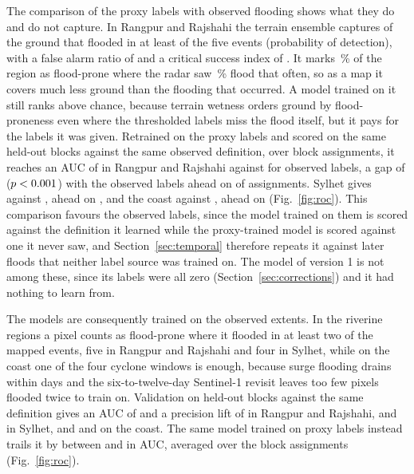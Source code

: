 \documentclass[10pt,a4paper,twocolumn]{article}
\begin{document}
\label{sec:labelresult}
The comparison of the proxy labels with observed flooding shows what they do and do not capture. In Rangpur and Rajshahi the terrain ensemble captures \RRProxyPOD{} of the ground that flooded in at least \RRMinEvents{} of the five events (probability of detection), with a false alarm ratio of \RRProxyFAR{} and a critical success index of \RRProxyCSI{}. It marks \RRProxyShare{}\,\% of the region as flood-prone where the radar saw \RRObservedShare{}\,\% flood that often, so as a map it covers much less ground than the flooding that occurred. A model trained on it still ranks above chance, because terrain wetness orders ground by flood-proneness even where the thresholded labels miss the flood itself, but it pays for the labels it was given. Retrained on the proxy labels and scored on the same held-out blocks against the same observed definition, over \RRBenchSeeds{} block assignments, it reaches an AUC of \RRLabelProxyAUC{} in Rangpur and Rajshahi against \RRLabelObsAUC{} for observed labels, a gap of \RRLabelGap{} ($p<0.001{}$) with the observed labels ahead on \RRLabelAhead{} of \RRBenchSeeds{} assignments. Sylhet gives \SylhetLabelProxyAUC{} against \SylhetLabelObsAUC{}, ahead on \SylhetLabelAhead{}, and the coast \CoastalLabelProxyAUC{} against \CoastalLabelObsAUC{}, ahead on \CoastalLabelAhead{} (Fig.~\ref{fig:roc}). This comparison favours the observed labels, since the model trained on them is scored against the definition it learned while the proxy-trained model is scored against one it never saw, and Section~\ref{sec:temporal} therefore repeats it against later floods that neither label source was trained on. The model of version 1 is not among these, since its labels were all zero (Section~\ref{sec:corrections}) and it had nothing to learn from.

The models are consequently trained on the observed extents. In the riverine regions a pixel counts as flood-prone where it flooded in at least two of the mapped events, five in Rangpur and Rajshahi and four in Sylhet, while on the coast one of the four cyclone windows is enough, because surge flooding drains within days and the six-to-twelve-day Sentinel-1 revisit leaves too few pixels flooded twice to train on. Validation on held-out blocks against the same definition gives an AUC of \RRValAUC{} and a precision lift of \RRValAPLift{} in Rangpur and Rajshahi, \SylhetValAUC{} and \SylhetValAPLift{} in Sylhet, and \CoastalValAUC{} and \CoastalValAPLift{} on the coast. The same model trained on proxy labels instead trails it by between \CoastalLabelGap{} and \RRLabelGap{} in AUC, averaged over the \RRBenchSeeds{} block assignments (Fig.~\ref{fig:roc}).
\end{document}

